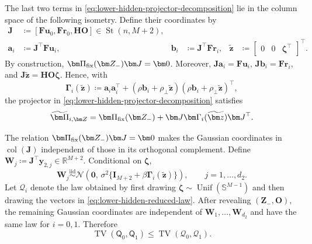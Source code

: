 \documentclass[11pt]{article}
\newcommand{\trans}{\top}
\DeclareMathOperator{\St}{St}
\begin{document}
The last two terms in
\cref{eq:lower-hidden-projector-decomposition} lie in the column space of
the following isometry.  Define their coordinates by
\begin{equation}
\begin{aligned}
  \bm J
  &\coloneqq
  [\bm F\bm u_0,\bm F\bm r_0,\bm H\bm O]
  \in\St(n,M+2),\\
  \bm a_i&\coloneqq\bm J^\trans\bm F\bm u_i,
  &\bm b_i&\coloneqq\bm J^\trans\bm F\bm r_i,
  &\widetilde{\bm z}&\coloneqq
  \begin{bmatrix}0&0&\bm\zeta^\trans\end{bmatrix}^\trans.
\end{aligned}
\label{eq:lower-hidden-reduced-coordinates}
\end{equation}
By construction, $\bm\Pi_{\rm fix}(\bm Z_-)\bm J=\bm0$.  Moreover,
$\bm J\bm a_i=\bm F\bm u_i$, $\bm J\bm b_i=\bm F\bm r_i$, and
$\bm J\widetilde{\bm z}=\bm H\bm O\bm\zeta$.  Hence, with
\begin{equation}
  \bm\Gamma_i(\widetilde{\bm z})
  \coloneqq
  \bm a_i\bm a_i^\trans
  +
  (\rho\bm b_i+\rho_\perp\widetilde{\bm z})
  (\rho\bm b_i+\rho_\perp\widetilde{\bm z})^\trans,
\label{eq:lower-hidden-Gamma-i}
\end{equation}
the projector in \cref{eq:lower-hidden-projector-decomposition} satisfies
\begin{equation}
  \widetilde{\bm\Pi}_{i,\bm Z}
  =
  \bm\Pi_{\rm fix}(\bm Z_-)
  +
  \bm J\bm\Gamma_i(\widetilde{\bm z})\bm J^\trans.
\label{eq:lower-hidden-final-projector-decomposition}
\end{equation}

The relation $\bm\Pi_{\rm fix}(\bm Z_-)\bm J=\bm0$ makes the Gaussian
coordinates in $\operatorname{col}(\bm J)$ independent of those in its
orthogonal complement.  Define
$\bm W_j\coloneqq\bm J^\trans\bm y_{2,j}\in\mathbb R^{M+2}$.  Conditional
on $\bm\zeta$,
\begin{equation}
  \bm W_j
  \overset{\mathrm{iid}}{\sim}
  \mathcal N\left(
    \bm0,\,
    \sigma^2\{\bm I_{M+2}+\beta\bm\Gamma_i(\widetilde{\bm z})\}
  \right),
  \qquad
  j=1,\ldots,d_2.
\label{eq:lower-hidden-reduced-law}
\end{equation}
Let $\mathcal Q_i$ denote the law obtained by first drawing
$\bm\zeta\sim\operatorname{Unif}(\mathbb S^{M-1})$ and then drawing the
vectors in \cref{eq:lower-hidden-reduced-law}.  After revealing
$(\bm Z_-,\bm O)$, the remaining Gaussian coordinates are independent of
$\bm W_1,\ldots,\bm W_{d_2}$ and have the same law for $i=0,1$.  Therefore
\begin{equation}
  \operatorname{TV}(\mathsf Q_0,\mathsf Q_1)
  \le
  \operatorname{TV}(\mathcal Q_0,\mathcal Q_1).
\label{eq:lower-hidden-TV-reduction}
\end{equation}
\end{document}
